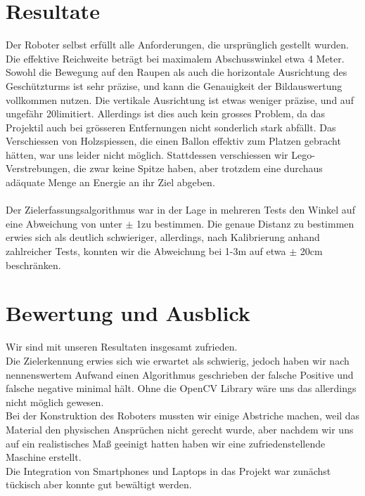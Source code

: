 \documentclass[12pt,a4paper]{article}
\begin{document}
\section{Resultate}
Der Roboter selbst erfüllt alle Anforderungen, die ursprünglich gestellt wurden. Die effektive Reichweite beträgt bei maximalem Abschusswinkel etwa 4 Meter. 
Sowohl die Bewegung auf den Raupen als auch die horizontale Ausrichtung des Geschützturms ist sehr präzise, und kann die Genauigkeit der Bildauswertung 
vollkommen nutzen. Die vertikale Ausrichtung ist etwas weniger präzise, und auf ungefähr 20\degree limitiert. Allerdings ist dies auch kein grosses Problem, da 
das Projektil auch bei grösseren Entfernungen nicht sonderlich stark abfällt. Das Verschiessen von Holzspiessen, die einen Ballon effektiv zum Platzen gebracht
hätten, war uns leider nicht möglich. Stattdessen verschiessen wir Lego-Verstrebungen, die zwar keine Spitze haben, aber trotzdem eine durchaus adäquate Menge
an Energie an ihr Ziel abgeben.\hfill\\
\hfill\\
Der Zielerfassungsalgorithmus war in der Lage in mehreren Tests den Winkel auf eine Abweichung von unter $\pm$ 1\degree zu bestimmen.
Die genaue Distanz zu bestimmen erwies sich als deutlich schwieriger, allerdings, nach Kalibrierung anhand zahlreicher Tests, konnten wir die Abweichung bei 1-3m auf etwa $\pm$ 20cm beschränken.

\section{Bewertung und Ausblick}
Wir sind mit unseren Resultaten insgesamt zufrieden.\hfill\\
Die Zielerkennung erwies sich wie erwartet als schwierig, jedoch haben wir nach nennenswertem Aufwand einen Algorithmus geschrieben der falsche Positive und falsche negative minimal hält. Ohne die OpenCV Library wäre uns das allerdings nicht möglich gewesen.\hfill\\
Bei der Konstruktion des Roboters mussten wir einige Abstriche machen, weil das Material den physischen Ansprüchen nicht gerecht wurde, aber nachdem wir uns auf ein realistisches Maß geeinigt hatten haben wir eine zufriedenstellende Maschine erstellt.\hfill\\
Die Integration von Smartphones und Laptops in das Projekt war zunächst tückisch aber konnte gut bewältigt werden.
\end{document}
